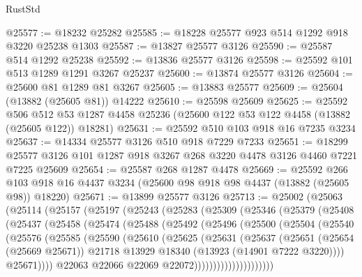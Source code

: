 \begin{lexlean}{RustStd}
\begin{coremodule}
@25577 := @18232 @25282
@25585 := @18228 @25577 @923 @514 @1292 @918 @3220 @25238 @1303
@25587 := @13827 @25577 @3126
@25590 := @25587 @514 @1292 @25238
@25592 := @13836 @25577 @3126
@25598 := @25592 @101 @513 @1289 @1291 @3267 @25237
@25600 := @13874 @25577 @3126
@25604 := @25600 @81 @1289 @81 @3267
@25605 := @13883 @25577
@25609 := @25604 (@13882 (@25605 @81)) @14222
@25610 := @25598 @25609
@25625 := @25592
    @506
    @512
    @53
    @1287
    @4458
    @25236
    (@25600 @122 @53 @122 @4458 (@13882 (@25605 @122)) @18281)
@25631 := @25592 @510 @103 @918 @16 @7235 @3234
@25637 := @14334 @25577 @3126 @510 @918 @7229 @7233
@25651 := @18299 @25577 @3126 @101 @1287 @918 @3267 @268 @3220 @4478 @3126 @4460 @7221 @7225 @25609
@25654 := @25587 @268 @1287 @4478
@25669 := @25592
    @266
    @103
    @918
    @16
    @4437
    @3234
    (@25600 @98 @918 @98 @4437 (@13882 (@25605 @98)) @18220)
@25671 := @13899 @25577 @3126
@25713 := @25002
    (@25063
      (@25114
        (@25157
          (@25197
            (@25243
              (@25283
                (@25309
                  (@25346
                    (@25379
                      (@25408
                        (@25437
                          (@25458
                            (@25474
                              (@25488
                                (@25492
                                  (@25496
                                    (@25500
                                      (@25504
                                        (@25540
                                          (@25576
                                            (@25585
                                              (@25590
                                                (@25610
                                                  (@25625
                                                    (@25631
                                                      (@25637
                                                        (@25651
                                                          (@25654 (@25669 @25671))
                                                          @21718
                                                          @13929
                                                          @18340
                                                          (@13923 (@14901 @7222 @3220))))
                                                      @25671))))
                                              @22063
                                              @22066
                                              @22069
                                              @22072)))))))))))))))))))))

\end{coremodule}
\end{lexlean}

